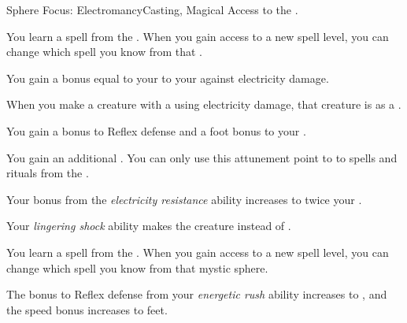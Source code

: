     \begin{feat}{Sphere Focus: Electromancy}{Casting, Magical}
        \featpre Access to the  .

         You learn a spell from the  .
        When you gain access to a new spell level, you can change which spell you know from that .

         You gain a bonus equal to your  to your  against electricity damage.

         When you make a creature  with a  using electricity damage, that creature is  as a .

         You gain a  bonus to Reflex defense and a  foot bonus to your .

         You gain an additional .
        You can only use this attunement point to  to spells and rituals from the  .

         Your bonus from the \textit{electricity resistance} ability increases to twice your .

         Your \textit{lingering shock} ability makes the creature  instead of .

         You learn a spell from the  .
        When you gain access to a new spell level, you can change which spell you know from that mystic sphere.

         The bonus to Reflex defense from your \textit{energetic rush} ability increases to , and the speed bonus increases to  feet.
    \end{feat}

